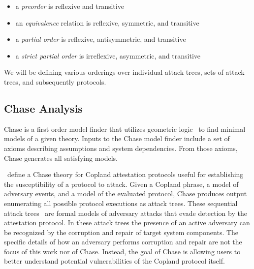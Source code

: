 \documentclass[runningheads]{llncs}
\theoremstyle{definition}
\newcommand{\squash}{\itemsep=0pt\parskip=0pt}
\begin{document}
\begin{itemize}
  \squash
\item a \emph{preorder} is reflexive and transitive
\item an \emph{equivalence} relation is reflexive, symmetric, and transitive 
\item a \emph{partial order} is reflexive, antisymmetric, and transitive 
\item a \emph{strict partial order} is irreflexive, asymmetric, and transitive 
\end{itemize}

We will be defining various orderings over individual attack trees,
sets of attack trees, and subsequently protocols.

\subsection*{Chase Analysis}

Chase \citep{Ramsdell:2020:Chase,Rowe:2021:AutomatedTrust} is a first
order model finder that utilizes geometric
logic~\citep{Enderton:logic} to find minimal models of a given
theory. Inputs to the Chase model finder include a set of axioms
describing assumptions and system dependencies. From those axioms,
Chase generates all satisfying models.


\citet{Rowe:2021:AutomatedTrust}~define a Chase theory for Copland
attestation protocols useful for establishing the susceptibility of a
protocol to attack. Given a Copland phrase, a model of adversary
events, and a model of the evaluated protocol, Chase produces output
enumerating all possible protocol executions as attack trees. These
sequential attack trees~\citep{Horne:Attack, Jhaware:attack} are
formal models of adversary attacks that evade detection by the
attestation protocol.  In these attack trees the presence of an active
adversary can be recognized by the corruption and repair of target
system components. The specific details of how an adversary performs
corruption and repair are not the focus of this work nor of
Chase. Instead, the goal of Chase is allowing users to better
understand potential vulnerabilities of the Copland
protocol itself.
\end{document}
